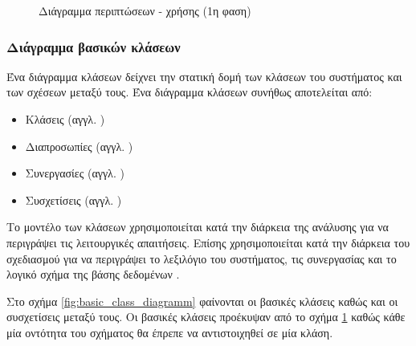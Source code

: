 \documentclass{assignment}
\begin{document}
\begin{figure}
\begin{center}
\caption{Διάγραμμα περιπτώσεων - χρήσης (1η φαση)}
\label{fig:activity_diagram(1st)}
\end{center}
\end{figure}

\subsubsection{Διάγραμμα βασικών κλάσεων} 

Ένα διάγραμμα κλάσεων δείχνει την στατική δομή των κλάσεων του συστήματος και των σχέσεων μεταξύ τους. Ένα διάγραμμα κλάσεων συνήθως αποτελείται από:

\begin{itemize}
\item Κλάσεις (αγγλ. )
\item Διαπροσωπίες (αγγλ. )
\item Συνεργασίες (αγγλ. )
\item Συσχετίσεις (αγγλ. )
\end{itemize}

Το μοντέλο των κλάσεων χρησιμοποιείται κατά την διάρκεια της ανάλυσης για να περιγράψει τις λειτουργικές απαιτήσεις. Επίσης χρησιμοποιείται κατά την διάρκεια του σχεδιασμού για να περιγράψει το λεξιλόγιο του συστήματος, τις συνεργασίας και το λογικό σχήμα της βάσης δεδομένων \cite{Rumbaugh:2004:UML:993859}.

Στο σχήμα \ref{fig:basic_class_diagramm} φαίνονται οι βασικές κλάσεις καθώς και οι συσχετίσεις μεταξύ τους. Οι βασικές κλάσεις προέκυψαν από το σχήμα \ref{fig:activity_diagram(1st)} καθώς κάθε μία οντότητα του σχήματος θα έπρεπε να αντιστοιχηθεί σε μία κλάση.
\end{document}
